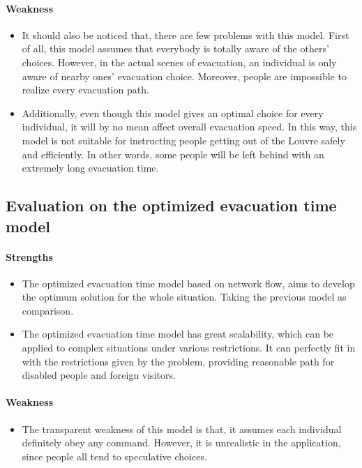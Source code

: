 \documentclass{mcmthesis}
\begin{document}
	\paragraph{Weakness}
	\begin{itemize}
		\item It should also be noticed that, there are few problems with this model. First of all, this model assumes that everybody is totally aware of the others' choices. However, in the actual scenes of evacuation, an individual is only aware of nearby ones' evacuation choice. Moreover, people are impossible to realize every evacuation path. 
		\item Additionally, even though this model gives an optimal choice for every individual, it will by no mean affect overall evacuation speed. In this way, this model is not suitable for instructing people getting out of the Louvre safely and efficiently. In other words, some people will be left behind with an extremely long evacuation time.
	\end{itemize}
	
	\subsection{Evaluation on the optimized evacuation time model}
	\paragraph{Strengths}
	
	\begin{itemize}
		\item The optimized evacuation time model based on network flow, aims to develop the optimum solution for the whole situation. Taking the previous model as comparison.
		\item The optimized evacuation time model has great scalability, which can be applied to complex situations under various restrictions. It can perfectly fit in with the restrictions given by the problem, providing reasonable path for disabled people and foreign visitors.
	\end{itemize}
	
	\paragraph{Weakness}
	\begin{itemize}
		\item The transparent weakness of this model is that, it assumes each individual definitely obey any command. However, it is unrealistic in the application, since people all tend to speculative choices.
		
	\end{itemize}
	
\end{document}
